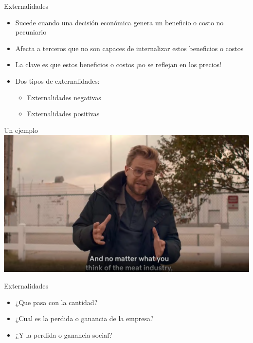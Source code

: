 \documentclass{beamer}
\begin{document}
\begin{frame}{Externalidades}
    \begin{itemize}
        \item Sucede cuando una decisión económica genera un beneficio o costo no pecuniario
        \item Afecta a terceros que no son capaces de internalizar estos beneficios o costos
        \item La clave es que estos beneficios o costos ¡no se reflejan en los precios!
        \vspace{1mm}
        \item Dos tipos de externalidades: 
        \begin{itemize}
            \item Externalidades negativas
            \vspace{1mm}
            \item Externalidades positivas
        \end{itemize}
        
    \end{itemize}
\end{frame}

\begin{frame}{Un ejemplo}
    \centering  
    \href{https://econ.video/2022/06/20/the-g-word-with-adam-conover-externalities-regulation/}{\includegraphics[scale=0.35]{Slides Principios de Economia/Figures/ExternalidadP.png}}  
\end{frame}

\begin{frame}{Externalidades}
    \begin{itemize}
        \item ¿Que pasa con la cantidad?
        \item ¿Cual es la perdida o ganancia de la empresa?
        \item ¿Y la perdida o ganancia social?
    \end{itemize}
\end{frame}
\end{document}
